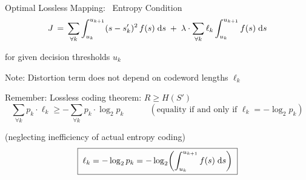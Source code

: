 

\begin{frame}{Optimal Lossless Mapping: ~Entropy Condition}
  \vspace{-1.0ex}
  $$
  J\,=\,\sum_{\forall k}\int_{u_k}^{u_{k+1}}(s-s'_k)^2\,f(s)\;\mathrm{d} s
  \;+\;\lambda\cdot\sum_{\forall k}\ell_k\int_{u_k}^{u_{k+1}}f(s)\;\mathrm{d} s
  $$
  \medskip
  \ben\setcounter{enumi}{1}
\item<+->  for given decision thresholds $u_k$
  \bit{}
\item<+->Note: Distortion term does not depend on codeword lengths $\ell_k$
\item<+->[\iarrow] Remember: Lossless coding theorem: $R\geq H(S')$
  \vspace{-.0ex}$$
  \sum_{\forall k}p_k\cdot\ell_k \geq -\sum_{\forall k}p_k\cdot\log_2p_k
  \quad\qquad(\text{equality if and only if $\ell_k=-\log_2p_k$})
  $$
  \eit
  \een
  \vspace{-3ex}
  \bit
\item<+->[\iarrow]  (neglecting inefficiency of actual entropy coding)
 \vspace{-0.5ex}$$
    \boxed{\;\ell_k=-\log_2p_k
    =-\log_2\!\left(\int_{u_k}^{u_{k+1}}f(s)\;\mathrm{d} s\right)\;}
  $$
\eit\vspace{-10ex}
\end{frame}
